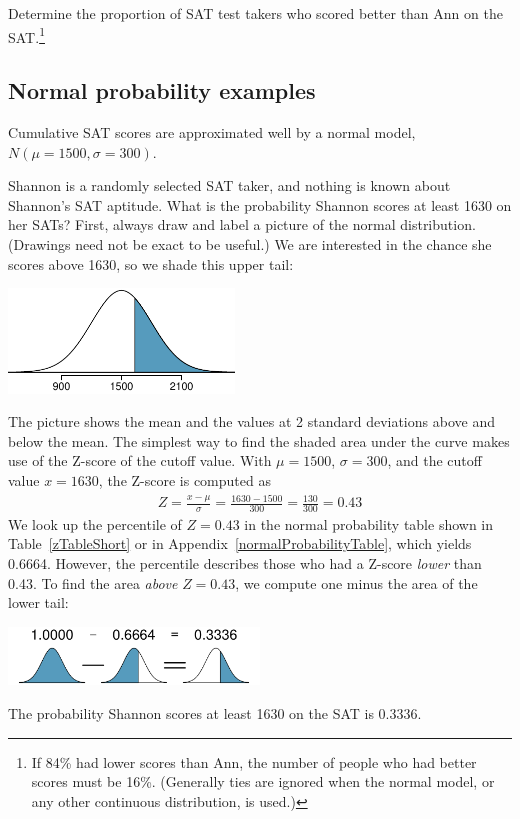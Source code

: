 \begin{exercise}
Determine the proportion of SAT test takers who scored better than Ann on the SAT.\footnote{If 84\% had lower scores than Ann, the number of people who had better scores must be 16\%. (Generally ties are ignored when the normal model, or any other continuous distribution, is used.)}
\end{exercise}


\textC{\newpage}


\subsection{Normal probability examples}

Cumulative SAT scores are approximated well by a normal model, $N(\mu=1500, \sigma=300)$.

\begin{example}{Shannon is a randomly selected SAT taker, and nothing is known about Shannon's SAT aptitude. What is the probability Shannon scores at least 1630 on her SATs?}\label{satAbove1630Exam}
First, always draw and label a picture of the normal distribution. (Drawings need not be exact to be useful.) We are interested in the chance she scores above 1630, so we shade this upper tail:
\begin{center}
\includegraphics[width=0.45\textwidth]{ch_distributions/figures/satAbove1630/satAbove1630}
\end{center}
The picture shows the mean and the values at 2 standard deviations above and below the mean. The simplest way to find the shaded area under the curve makes use of the Z-score of the cutoff value. With $\mu=1500$, $\sigma=300$, and the cutoff value $x=1630$, the Z-score is computed as
\begin{eqnarray*}
Z = \frac{x - \mu}{\sigma} = \frac{1630 - 1500}{300} = \frac{130}{300} = 0.43
\end{eqnarray*}
We look up the percentile of $Z=0.43$ in the normal probability table shown in Table~\ref{zTableShort} or in Appendix~\vref{normalProbabilityTable}, which yields 0.6664. However, the percentile describes those who had a Z-score \emph{lower} than 0.43. To find the area \emph{above} $Z=0.43$, we compute one minus the area of the lower tail:
\begin{center}
\includegraphics[width=0.5\textwidth]{ch_distributions/figures/subtractingArea/subtractingArea}
\end{center}
The probability Shannon scores at least 1630 on the SAT is 0.3336.
\end{example}

